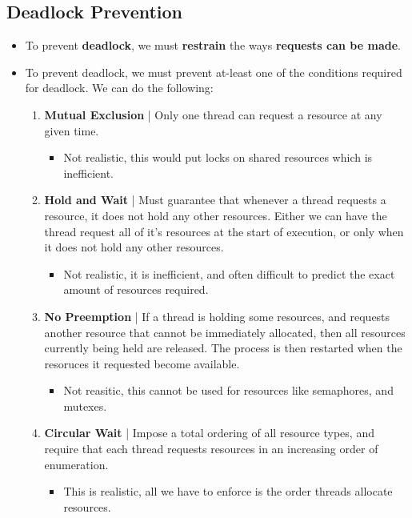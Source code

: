 \documentclass{article}
\begin{document}
    \subsection*{Deadlock Prevention}
    \begin{itemize}
        \item To prevent \textbf{deadlock}, we must \textbf{restrain} the ways \textbf{requests can be made}.
        \item To prevent deadlock, we must prevent at-least one of the conditions required for deadlock. We can do the following:
        \begin{enumerate}
            \item \textbf{Mutual Exclusion} | Only one thread can request a resource at any given time.
            \begin{itemize}
                \item Not realistic, this would put locks on shared resources which is inefficient.
            \end{itemize}
            \item \textbf{Hold and Wait} | Must guarantee that whenever a thread requests a resource, it does not hold any other resources. Either we can have the thread request all of it's resources at the start of execution, or only when it does not hold any other resources.
            \begin{itemize}
                \item Not realistic, it is inefficient, and often difficult to predict the exact amount of resources required.
            \end{itemize}
            \item \textbf{No Preemption} | If a thread is holding some resources, and requests another resource that cannot be immediately allocated, then all resources currently being held are released. The process is then restarted when the resoruces it requested become available.
            \begin{itemize}
                \item Not reasitic, this cannot be used for resources like semaphores, and mutexes.
            \end{itemize}
            \item \textbf{Circular Wait} | Impose a total ordering of all resource types, and require that each thread requests resources in an increasing order of enumeration.
            \begin{itemize}
                \item This is realistic, all we have to enforce is the order threads allocate resources.
            \end{itemize}
        \end{enumerate}
    \end{itemize}
\end{document}
